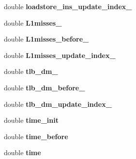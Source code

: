 \begin{DoxyCompactItemize}
\item 
\hypertarget{structthread__info_aa2ed909b84d3a5992304f325e8f53370}{double {\bfseries loadstore\-\_\-ins\-\_\-update\-\_\-index\-\_\-}}\label{structthread__info_aa2ed909b84d3a5992304f325e8f53370}

\item 
\hypertarget{structthread__info_a06a31de1c7b3c7816134bf8061d7606a}{double {\bfseries L1misses\-\_\-}}\label{structthread__info_a06a31de1c7b3c7816134bf8061d7606a}

\item 
\hypertarget{structthread__info_aa469d0b1eb8358959a6aeff4505af390}{double {\bfseries L1misses\-\_\-before\-\_\-}}\label{structthread__info_aa469d0b1eb8358959a6aeff4505af390}

\item 
\hypertarget{structthread__info_a9ddd4c5006af03836e52c084e98f8380}{double {\bfseries L1misses\-\_\-update\-\_\-index\-\_\-}}\label{structthread__info_a9ddd4c5006af03836e52c084e98f8380}

\item 
\hypertarget{structthread__info_acd070e78d9037104a700a9531a1277ce}{double {\bfseries tlb\-\_\-dm\-\_\-}}\label{structthread__info_acd070e78d9037104a700a9531a1277ce}

\item 
\hypertarget{structthread__info_a3cebdfe8a2a91f47fe5de21c259d4ef3}{double {\bfseries tlb\-\_\-dm\-\_\-before\-\_\-}}\label{structthread__info_a3cebdfe8a2a91f47fe5de21c259d4ef3}

\item 
\hypertarget{structthread__info_a999589fcd5808176334ca435c1042a78}{double {\bfseries tlb\-\_\-dm\-\_\-update\-\_\-index\-\_\-}}\label{structthread__info_a999589fcd5808176334ca435c1042a78}

\item 
\hypertarget{structthread__info_a437c53fdd945c4c378a38f32f09a4cc0}{double {\bfseries time\-\_\-init}}\label{structthread__info_a437c53fdd945c4c378a38f32f09a4cc0}

\item 
\hypertarget{structthread__info_a0ca326a64b502fa7ae993ba0244b1002}{double {\bfseries time\-\_\-before}}\label{structthread__info_a0ca326a64b502fa7ae993ba0244b1002}

\item 
\hypertarget{structthread__info_a297a4028550d6481b74642b25ce6db86}{double {\bfseries time}}\label{structthread__info_a297a4028550d6481b74642b25ce6db86}


\end{DoxyCompactItemize}
